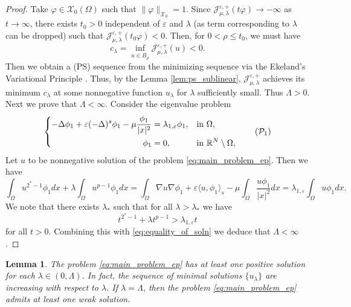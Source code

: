 \documentclass[11pt]{article}
\newtheorem{lemma}{Lemma}[section] %
\newcommand{\om} {\Omega}
\newcommand{\la} {\lambda}
\newcommand{\La} {\Lambda}
\newcommand{\grad}{\nabla}
\newcommand{\X}{\mathcal{X}_0} %
\newcommand{\Jep}{\mathcal{J}_{\mu, \lambda}^{\varepsilon,+}}
\begin{document}
\begin{proof}
Take $\varphi \in \X(\om)$ such that $\|\varphi\|_{\X} = 1$. Since $\Jep(t \varphi) \to -\infty$ as $t \to \infty$, there exists $t_0 > 0$ independent of $\varepsilon$ and $\la$ (as term corresponding to $\la$ can be dropped) such that $\Jep(t_0 \varphi) < 0$. Then, for $0 < \rho \leq t_0$, we must have
\begin{equation*}
c_{\lambda} = \inf_{u \in \overline{B_{\rho}}} \Jep(u) < 0.
\end{equation*}
Then we obtain a (PS) sequence from the minimizing sequence via the Ekeland's Variational Principle \cite[Theorem 8.5]{willem2012minimax}. Thus, by the Lemma \ref{lem:ps_sublinear}, $\Jep$ achieves its minimum $c_{\lambda}$ at some nonnegative function $u_{\lambda}$ for $\la$ sufficiently small. Thus $\La > 0.$\\
Next we prove that $\La  < \infty$. Consider the eigenvalue problem 
\begin{equation*}
\left\{
\begin{aligned}
- \Delta \phi_1 + \varepsilon  (-\Delta)^s \phi_1 - \mu \frac{\phi_1}{|x|^2} &= {\lambda_{1,\varepsilon}} \phi_1, && \text{in } \Omega, \\
\phi_1 &= 0, && \text{in } \mathbb{R}^N \setminus \Omega,
\end{aligned}
\right. \tag{$\mathcal{P}_1$}
\end{equation*}
Let $u$ to be nonnegative solution of the problem \eqref{eq:main_problem_ep}. Then we have
\begin{equation} \label{eq:equality_of_soln}
\int_{\om} u^{2^*-1} \phi_1 dx + \la \int_{\om} u^{p-1} \phi_1 dx = \int_{\om} \grad u  \grad \phi_1 + \varepsilon \langle u , \phi_1 \rangle_s - \mu \int_{\om} \frac{u \phi_1}{|x|^2} dx = \lambda_{1,\varepsilon} \int_{\om} u \phi_1 dx.
\end{equation}
We note that there exists $\la_*$ such that for all $\la > \la_*$ we have 
\begin{equation*}
    t^{2^* - 1} + \la t^{p-1} > \la_{1,\varepsilon} t 
\end{equation*}
for all $t > 0$. Combining this with \eqref{eq:equality_of_soln} we deduce that $\La < \infty$.
\end{proof}
\begin{lemma}\label{lem:existence_each_lambda}
    The problem \eqref{eq:main_problem_ep} has at least one positive solution for each $\la \in (0, \La)$. In fact, the sequence of minimal solutions $\{u_\la \}$ are increasing with respect to $\la$. If $\la = \La$, then the problem \eqref{eq:main_problem_ep} admits at least one weak solution.
\end{lemma}
\end{document}
